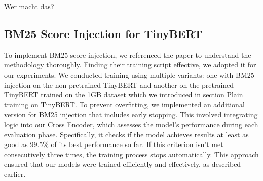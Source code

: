 {\color{red} Wer macht das?}

\subsection{BM25 Score Injection for TinyBERT}


To implement BM25 score injection, we referenced the paper \cite{askari23} to understand the methodology thoroughly. Finding their training script effective, we adopted it for our experiments. We conducted training using multiple variants: one with BM25 injection on the non-pretrained TinyBERT and another on the pretrained TinyBERT trained on the 1GB dataset which we introduced in section \hyperref[plaintiny]{Plain training on TinyBERT}. To prevent overfitting, we implemented an additional version for BM25 injection that includes early stopping. This involved integrating logic into our Cross Encoder, which assesses the model's performance during each evaluation phase. Specifically, it checks if the model achieves results at least as good as 99.5\% of its best performance so far. If this criterion isn't met consecutively three times, the training process stops automatically. This approach ensured that our models were trained efficiently and effectively, as described earlier.